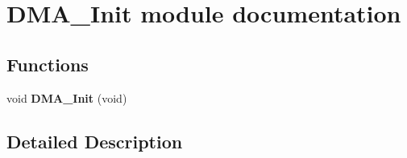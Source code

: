 \hypertarget{group___d_m_a___init__module}{}\section{D\+M\+A\+\_\+\+Init module documentation}
\label{group___d_m_a___init__module}
\subsection*{Functions}
\begin{DoxyCompactItemize}
\item 
void {\bfseries D\+M\+A\+\_\+\+Init} (void)\hypertarget{group___d_m_a___init__module_ga92a2de6fa92b36d1801358ea9b12273b}{}\label{group___d_m_a___init__module_ga92a2de6fa92b36d1801358ea9b12273b}

\end{DoxyCompactItemize}


\subsection{Detailed Description}
